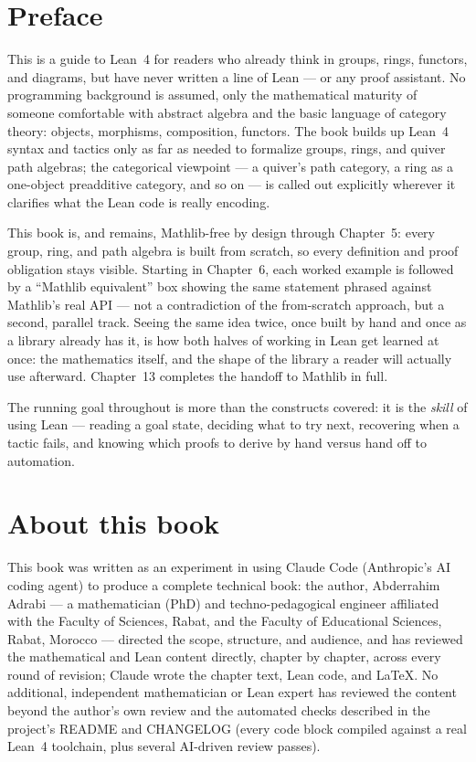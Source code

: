 \chapter*{Preface}

This is a guide to Lean~4 for readers who already think in groups, rings,
functors, and diagrams, but have never written a line of Lean --- or any
proof assistant. No programming background is assumed, only the
mathematical maturity of someone comfortable with abstract algebra and the
basic language of category theory: objects, morphisms, composition,
functors. The book builds up Lean~4 syntax and tactics only as far as
needed to formalize groups, rings, and quiver path algebras; the
categorical viewpoint --- a quiver's path category, a ring as a one-object
preadditive category, and so on --- is called out explicitly wherever it
clarifies what the Lean code is really encoding.

This book is, and remains, Mathlib-free by design through Chapter~5: every
group, ring, and path algebra is built from scratch, so every definition
and proof obligation stays visible. Starting in Chapter~6, each worked
example is followed by a ``Mathlib equivalent'' box showing the same
statement phrased against Mathlib's real API --- not a contradiction of
the from-scratch approach, but a second, parallel track. Seeing the same
idea twice, once built by hand and once as a library already has it, is
how both halves of working in Lean get learned at once: the mathematics
itself, and the shape of the library a reader will actually use
afterward. Chapter~13 completes the handoff to Mathlib in full.

The running goal throughout is more than the constructs covered: it is
the \emph{skill} of using Lean --- reading a goal state, deciding what to
try next, recovering when a tactic fails, and knowing which proofs to
derive by hand versus hand off to automation.

\chapter*{About this book}
This book was written as an experiment in using Claude Code (Anthropic's
AI coding agent) to produce a complete technical book: the author,
Abderrahim Adrabi --- a mathematician (PhD) and techno-pedagogical
engineer affiliated with the Faculty of Sciences, Rabat, and the Faculty
of Educational Sciences, Rabat, Morocco --- directed the scope,
structure, and audience, and has reviewed the mathematical and Lean
content directly, chapter by chapter, across every round of revision;
Claude wrote the chapter text, Lean code, and LaTeX. No additional,
independent mathematician or Lean expert has reviewed the content beyond
the author's own review and the automated checks described in the
project's README and CHANGELOG (every code block compiled against a real
Lean~4 toolchain, plus several AI-driven review passes).

